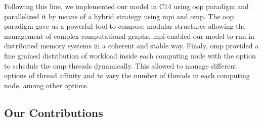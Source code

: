 \documentclass[10pt,journal,compsoc]{IEEEtran}
\newcommand{\CC}{C\nolinebreak\hspace{-.05em}\raisebox{.4ex}{\tiny\bf +}\nolinebreak\hspace{-.10em}\raisebox{.4ex}{\tiny\bf +}}
\begin{document}
Following this line, we implemented our model in \CC14 using \gls{oop} paradigm and parallelized it by means of a hybrid strategy using \gls{mpi} and \gls{omp}. The \gls{oop} paradigm gave us a powerful tool to compose modular structures allowing the management of complex computational graphs. \gls{mpi} enabled our model to run in distributed memory systems in a coherent and stable way. Finaly, \gls{omp} provided a fine grained distribution of  workload inside each computing node with the option to schedule the \gls{omp} threads dynamically. This allowed to manage different options of thread affinity and to vary the number of threads in each computing node, among other options.













\subsection{Our Contributions}


\end{document}
